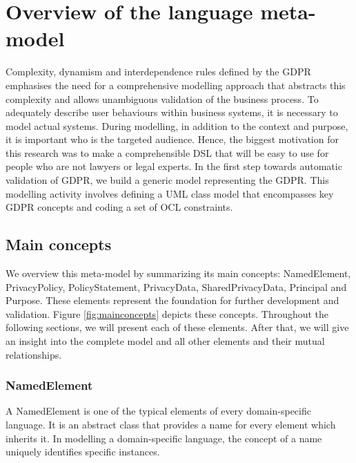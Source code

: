 \documentclass[11pt,english]{article}
\begin{document}
\section{Overview of the language meta-model}
Complexity, dynamism and interdependence rules defined by the GDPR emphasises the need for a comprehensive modelling approach that abstracts this complexity and allows unambiguous validation of the business process. To adequately describe user behaviours within business systems, it is necessary to model actual systems. During modelling, in addition to the context and purpose, it is important who is the targeted audience. Hence, the biggest motivation for this research was to make a comprehensible DSL that will be easy to use for people who are not lawyers or legal experts. In the first step towards automatic validation of GDPR, we build a generic model representing the GDPR. This modelling activity involves defining a UML class model that encompasses key GDPR concepts and coding a set of OCL constraints.
\subsection{Main concepts}
We overview this meta-model by summarizing its main concepts: NamedElement, PrivacyPolicy, PolicyStatement, PrivacyData, SharedPrivacyData, Principal and Purpose. These elements represent the foundation for further development and validation. Figure \ref{fig:mainconcepts} depicts these concepts. Throughout the following sections, we will present each of these elements. After that, we will give an insight into the complete model and all other elements and their mutual relationships.
\subsubsection{NamedElement}
A NamedElement is one of the typical elements of every domain-specific language. It is an abstract class that provides a name for every element which inherits it. In modelling a domain-specific language, the concept of a name uniquely identifies specific instances.
\end{document}
